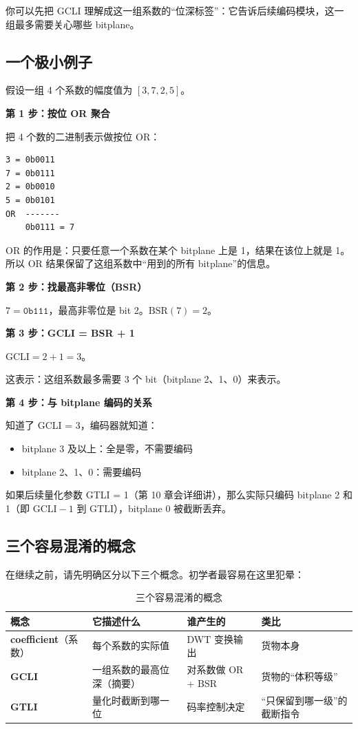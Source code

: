 你可以先把 GCLI 理解成这一组系数的``位深标签''：它告诉后续编码模块，这一组最多需要关心哪些 bitplane。

\subsection{一个极小例子}

假设一组 4 个系数的幅度值为 $[3, 7, 2, 5]$。

\textbf{第 1 步：按位 OR 聚合}

把 4 个数的二进制表示做按位 OR：

\begin{lstlisting}[numbers=none]
3 = 0b0011
7 = 0b0111
2 = 0b0010
5 = 0b0101
OR  -------
    0b0111 = 7
\end{lstlisting}

OR 的作用是：只要任意一个系数在某个 bitplane 上是 1，结果在该位上就是 1。所以 OR 结果保留了这组系数中``用到的所有 bitplane''的信息。

\textbf{第 2 步：找最高非零位（BSR）}

$7 = \texttt{0b111}$，最高非零位是 bit 2。$\mathrm{BSR}(7) = 2$。

\textbf{第 3 步：GCLI = BSR + 1}

$\mathrm{GCLI} = 2 + 1 = 3$。

这表示：这组系数最多需要 3 个 bit（bitplane 2、1、0）来表示。

\textbf{第 4 步：与 bitplane 编码的关系}

知道了 GCLI = 3，编码器就知道：
\begin{itemize}
  \item bitplane 3 及以上：全是零，不需要编码
  \item bitplane 2、1、0：需要编码
\end{itemize}

如果后续量化参数 GTLI = 1（第 10 章会详细讲），那么实际只编码 bitplane 2 和 1（即 $\mathrm{GCLI}-1$ 到 $\mathrm{GTLI}$），bitplane 0 被截断丢弃。

\subsection{三个容易混淆的概念}

在继续之前，请先明确区分以下三个概念。初学者最容易在这里犯晕：

\begin{table}[H]
\centering
\caption{三个容易混淆的概念}
\begin{tabular}{@{}lp{4.5cm}lp{3cm}@{}}
\toprule
概念 & 它描述什么 & 谁产生的 & 类比 \\
\midrule
\textbf{coefficient}（系数） & 每个系数的实际值 & DWT 变换输出 & 货物本身 \\
\textbf{GCLI} & 一组系数的最高位深（摘要） & 对系数做 OR + BSR & 货物的``体积等级'' \\
\textbf{GTLI} & 量化时截断到哪一位 & 码率控制决定 & ``只保留到哪一级''的截断指令 \\
\bottomrule
\end{tabular}
\end{table}

